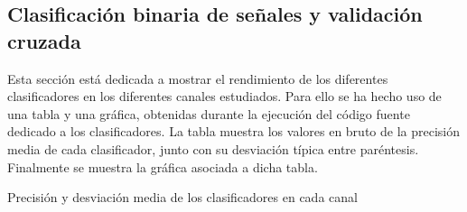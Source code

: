     \subsection{Clasificación binaria de señales y validación cruzada}
    Esta sección está dedicada a mostrar el rendimiento de los diferentes clasificadores en los diferentes canales estudiados. Para ello se ha hecho uso de una tabla y una gráfica, obtenidas durante la ejecución del código fuente dedicado a los clasificadores. La tabla muestra los valores en bruto de la precisión media de cada clasificador, junto con su desviación típica entre paréntesis. Finalmente se muestra la gráfica asociada a dicha tabla.
    
    \begin{table}[!ht]
    \centering
    \caption{Precisión y desviación media de los clasificadores en cada canal }
    

\end{table}
